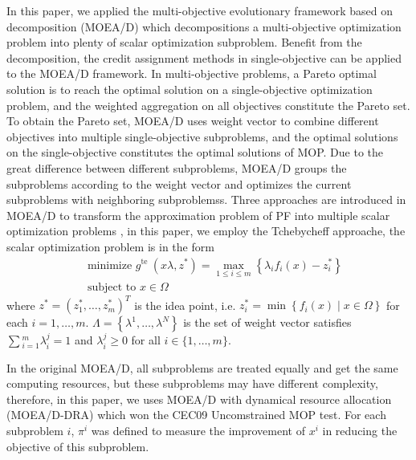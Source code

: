 \documentclass[journal]{IEEEtran}
\begin{document}
In this paper, we applied the multi-objective evolutionary framework based on decomposition (MOEA/D) \cite{moead} which decompositions a multi-objective optimization problem into plenty of scalar optimization subproblem. Benefit from the decomposition, the credit assignment methods in single-objective can be applied to the MOEA/D framework.
In multi-objective problems, a Pareto optimal solution is to reach the optimal solution on a single-objective optimization problem, and the weighted aggregation on all objectives constitute the Pareto set.
To obtain the Pareto set, MOEA/D uses weight vector to combine different objectives into multiple single-objective subproblems, and the optimal solutions on the single-objective constitutes the optimal solutions of MOP.
Due to the great difference between different subproblems, MOEA/D groups the subproblems according to the weight vector and optimizes the current subproblems with neighboring subproblemss.
Three approaches are introduced in MOEA/D to transform the approximation problem of PF into multiple scalar optimization problems \cite{moead}, in this paper, we employ the Tchebycheff approache, the scalar optimization problem is in the form
\begin{equation}
  \begin{aligned}
     & \text { minimize } g^{\text {te }}\left(x \lambda, z^{*}\right)=\max _{1 \leq i \leq m}\left\{\lambda_{i} f_{i}(x)-z_{i}^{*}\right\} \\
     & \text { subject to } x \in \Omega
  \end{aligned}
\end{equation}
where $z^{*}=\left(z_{1}^{*}, \ldots, z_{m}^{*}\right)^{T}$ is the idea point, i.e. $z_{i}^{*}=\min \left\{f_{i}(x) \mid x \in \Omega\right\}$ for each $i = 1, \dots , m$. $\Lambda=\left\{\lambda^{1}, \ldots, \lambda^{N}\right\}$ is the set of weight vector satisfies $\sum{^m_{i=1} \lambda ^j_i=1}$ and $\lambda^j_i \geq 0$ for all $i \in \{1,\dots, m\}$.

In the original MOEA/D, all subproblems are treated equally and get the same computing resources,
but these subproblems may have different complexity, therefore, in this paper, we uses MOEA/D with dynamical resource allocation (MOEA/D-DRA) \cite{moead-dra} which won the CEC09 Uncomstrained MOP test.
For each subproblem $i$, $\pi^i$ was defined to measure the improvement of $x^i$ in reducing the objective of this subproblem.
\end{document}
